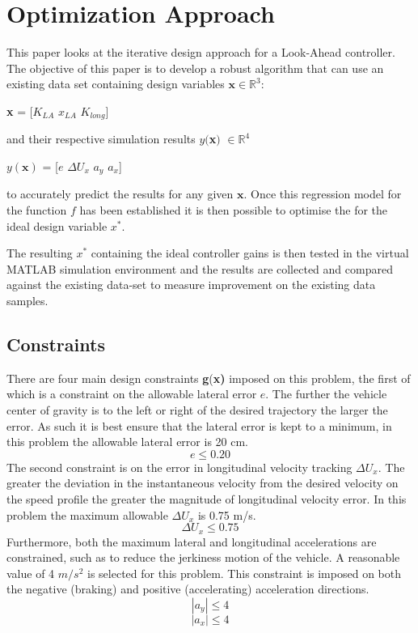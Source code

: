 \documentclass[conf]{new-aiaa}
\begin{document}
\section{Optimization Approach}
This paper looks at the iterative design approach for a Look-Ahead controller. The objective of this paper is to develop a robust algorithm that can use an existing data set containing design variables $\textbf{x} \in \mathbb{R}^3$:
\begin{center}
\textbf{x} = [$K_{LA}$    $x_{LA}$  $K_{long}$]
 \end{center}
and their respective simulation results $y($\textbf{x}$)$ $\in \mathbb{R}^4$
 \begin{center}
$y(\textbf{x})$ = [$e$    $\Delta U_{x}$  $a_y$   $a_x$]
 \end{center}
to accurately predict the results for any given $\textbf{x}$. Once this regression model for the function $f$ has been established it is then possible to optimise the for the ideal design variable $x^*$. 
 
The resulting $x^*$ containing the ideal controller gains is then tested in the virtual MATLAB simulation environment and the results are collected and compared against the existing data-set to measure improvement on the existing data samples.

\subsection{Constraints}

There are four main design constraints \textbf{g}(\textbf{x)} imposed on this problem, the first of which is a constraint on the allowable lateral error $e$. The further the vehicle center of gravity is to the left or right of the desired trajectory the larger the error. As such it is best ensure that the lateral error is kept to a minimum, in this problem the allowable lateral error is 20 cm.
\[e\leq0.20\]
The second constraint is on the error in longitudinal velocity tracking $\Delta U_x$. The greater the deviation in the instantaneous velocity from the desired velocity on the speed profile the greater the magnitude of longitudinal velocity error. In this problem the maximum allowable $\Delta U_x$ is 0.75 m/s.
\[\Delta U_x\leq0.75\]
Furthermore, both the maximum lateral and longitudinal accelerations are constrained, such as to reduce the jerkiness motion of the vehicle. A reasonable value of 4 $m/s^2$ is selected for this problem. This constraint is imposed on both the negative (braking) and positive (accelerating) acceleration directions.
\[|a_y|\leq4\]
\[|a_x|\leq4\]
\end{document}

